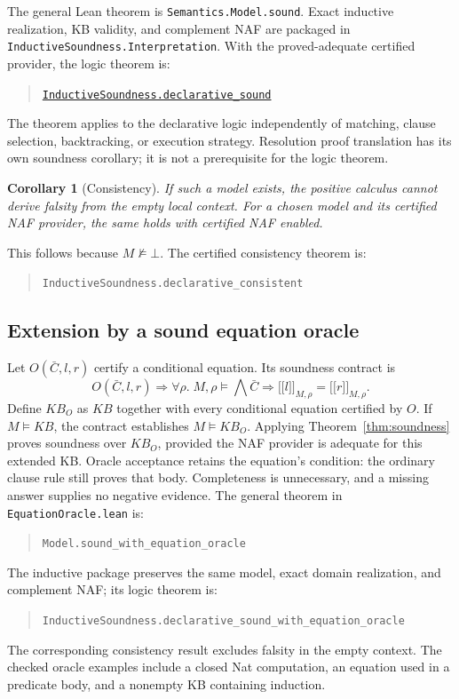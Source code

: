 \documentclass[11pt]{article}
\newtheorem{corollary}{Corollary}
\newcommand{\KB}{\mathit{KB}}
\begin{document}
The general Lean theorem is \texttt{Semantics.Model.sound}. Exact inductive
realization, KB validity, and complement NAF are packaged in
\texttt{InductiveSoundness.Interpretation}. With the proved-adequate certified
provider, the logic theorem is:
\begin{quote}
\href{AnthillModKbSpec/Resolution/InductiveSoundness.lean}{\texttt{InductiveSoundness.declarative\_sound}}
\end{quote}
The theorem applies to the declarative logic independently of matching, clause
selection, backtracking, or execution strategy. Resolution proof translation
has its own soundness corollary; it is not a prerequisite for the logic theorem.

\begin{corollary}[Consistency]
If such a model exists, the positive calculus cannot derive falsity from the
empty local context. For a chosen model and its certified NAF provider, the
same holds with certified NAF enabled.
\end{corollary}
This follows because $M\not\models\bot$. The certified consistency theorem is:
\begin{quote}
\texttt{InductiveSoundness.declarative\_consistent}
\end{quote}

\subsection*{Extension by a sound equation oracle}
Let $O(\bar C,l,r)$ certify a conditional equation. Its soundness contract is
\[
 O(\bar C,l,r)\Longrightarrow
 \forall\rho.\;M,\rho\models\bigwedge\bar C\Longrightarrow
 \lbrack\!\lbrack l\rbrack\!\rbrack_{M,\rho}
 =\lbrack\!\lbrack r\rbrack\!\rbrack_{M,\rho}.
\]
Define $\KB_O$ as $\KB$ together with every conditional equation certified by $O$.
If $M\models\KB$, the contract establishes $M\models\KB_O$. Applying
Theorem~\ref{thm:soundness} proves soundness over $\KB_O$, provided the NAF
provider is adequate for this extended KB. Oracle acceptance retains the
equation's condition: the ordinary clause rule still proves that body.
Completeness is unnecessary, and a missing answer supplies no negative evidence.
The general theorem in \texttt{EquationOracle.lean} is:
\begin{quote}
\texttt{Model.sound\_with\_equation\_oracle}
\end{quote}
The inductive package preserves the same model, exact domain realization, and
complement NAF; its logic theorem is:
\begin{quote}
\texttt{InductiveSoundness.declarative\_sound\_with\_equation\_oracle}
\end{quote}
The corresponding consistency result excludes falsity in the empty context.
The checked oracle examples include a closed Nat computation, an equation used
in a predicate body, and a nonempty KB containing induction.
\end{document}
